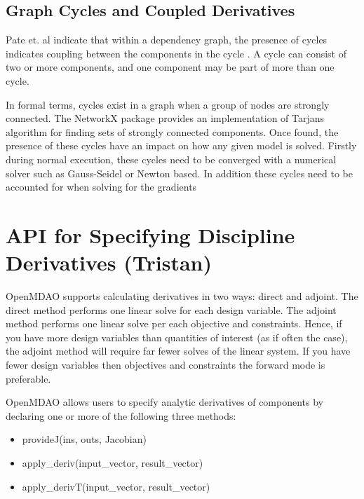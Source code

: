 \documentclass[]{aiaa-tc} %
\begin{document}
    
    \subsection{Graph Cycles and Coupled Derivatives}

        Pate et. al indicate that within a dependency graph, the presence of cycles indicates coupling between
        the components in the cycle \cite{graph_problem2013}. A cycle can consist of two or more components, and
        one component may be part of more than one cycle.

        In formal terms, cycles exist in a graph when a group of nodes are strongly connected. The NetworkX package
        provides an implementation of Tarjans algorithm for finding sets of strongly connected
        components\cite{tarjan1972depth,nuutila1994finding}. Once found, the presence of these cycles
        have an impact on how any given model is solved. Firstly during normal execution, these cycles
        need to be converged with a numerical solver such as Gauss-Seidel or Newton based.
        In addition these cycles need to be accounted for when solving for the gradients

   
    \section{API for Specifying Discipline Derivatives (Tristan)}

        OpenMDAO supports calculating derivatives in two ways: direct and adjoint. The direct method performs
        one linear solve for each design variable. The adjoint method performs one linear solve per each objective
        and constraints. Hence, if you have more design variables than quantities of interest (as if often the case),
        the adjoint method will require far fewer solves of the linear system. If you have fewer design variables then
        objectives and constraints the forward mode is preferable.

        OpenMDAO allows users to specify analytic derivatives of components by declaring one or more of the following three
        methods:

        \begin{itemize}
            \item provideJ(ins, outs, Jacobian)
            \item apply\_deriv(input\_vector, result\_vector)
            \item apply\_derivT(input\_vector, result\_vector)
        \end{itemize}
\end{document}
